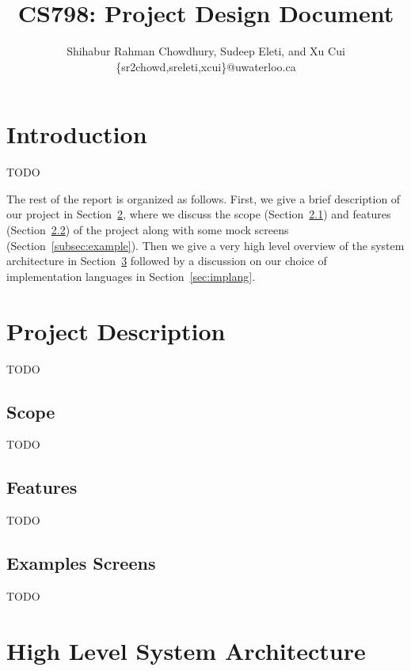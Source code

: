 \documentclass[letterpaper]{article}
\newcommand{\sect}[1]{Section~\ref{#1}}
\begin{document}
\title{CS798: Project Design Document}%
\author{Shihabur Rahman Chowdhury, Sudeep Eleti, and Xu Cui\\%
  \{sr2chowd,sreleti,xcui\}@uwaterloo.ca}

\date{}
\maketitle%


\section{Introduction}
\label{sec:intro}

TODO

The rest of the report is organized as follows. First, we give a brief description of our project in \sect{sec:desc}, where we discuss the scope (\sect{subsec:scope}) and features (\sect{subsec:feature}) of the project along with some mock screens (\sect{subsec:example}). Then we give a very high level overview of the system architecture in \sect{sec:sysarch} followed by a discussion on our choice of implementation languages in \sect{sec:implang}.
\section{Project Description}
\label{sec:desc}

TODO

\subsection{Scope}
\label{subsec:scope}

TODO

\subsection{Features}
\label{subsec:feature}

TODO

\subsection{Examples Screens}
\label{sec:example}

TODO

\section{High Level System Architecture}
\label{sec:sysarch}
\end{document}
